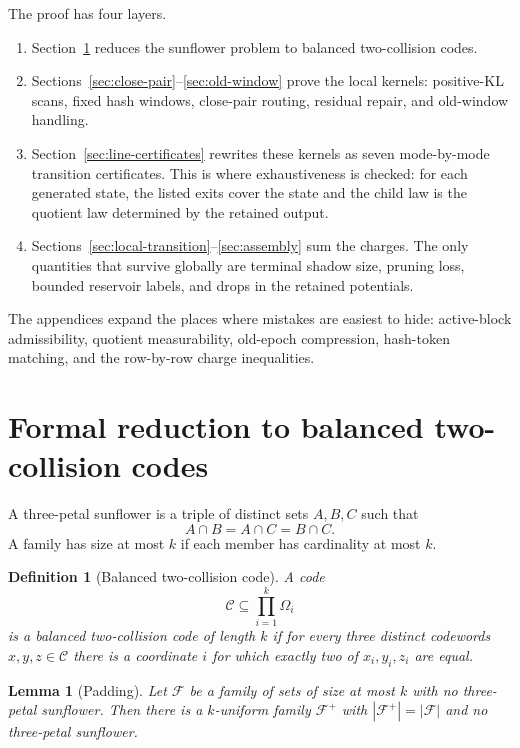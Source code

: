 \documentclass[11pt]{article}
\newtheorem{lemma}[theorem]{Lemma}
\newtheorem{definition}[theorem]{Definition}
\theoremstyle{remark}
\newcommand{\C}{\mathcal C}
\newcommand{\F}{\mathcal F}
\begin{document}
The proof has four layers.
\begin{enumerate}[leftmargin=2em]
\item Section~\ref{sec:formal-reduction} reduces the sunflower problem to
balanced two-collision codes.
\item Sections~\ref{sec:close-pair}--\ref{sec:old-window} prove the local
kernels: positive-KL scans, fixed hash windows, close-pair routing, residual
repair, and old-window handling.
\item Section~\ref{sec:line-certificates} rewrites these kernels as seven
mode-by-mode transition certificates.  This is where exhaustiveness is checked:
for each generated state, the listed exits cover the state and the child law is
the quotient law determined by the retained output.
\item Sections~\ref{sec:local-transition}--\ref{sec:assembly} sum the charges.
The only quantities that survive globally are terminal shadow size, pruning
loss, bounded reservoir labels, and drops in the retained potentials.
\end{enumerate}
The appendices expand the places where mistakes are easiest to hide:
active-block admissibility, quotient measurability, old-epoch compression,
hash-token matching, and the row-by-row charge inequalities.

\section{Formal reduction to balanced two-collision codes}\label{sec:formal-reduction}

A three-petal sunflower is a triple of distinct sets $A,B,C$ such that
\[
        A\cap B=A\cap C=B\cap C.
\]
A family has size at most $k$ if each member has cardinality at most $k$.

\begin{definition}[Balanced two-collision code]
A code
\[
        \C\subseteq \prod_{i=1}^{k}\Omega_i
\]
is a balanced two-collision code of length $k$ if for every three distinct codewords $x,y,z\in\C$ there is a coordinate $i$ for which exactly two of $x_i,y_i,z_i$ are equal.
\end{definition}

\begin{lemma}[Padding]
Let $\F$ be a family of sets of size at most $k$ with no three-petal sunflower.  Then there is a $k$-uniform family $\F^+$ with $|\F^+|=|\F|$ and no three-petal sunflower.
\end{lemma}
\end{document}
